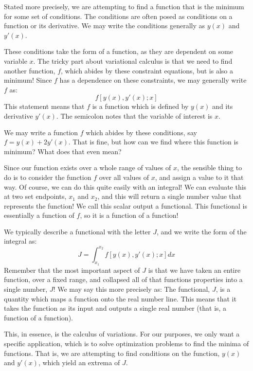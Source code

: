 Stated more precisely, we are attempting to find a function that is the minimum for some set of conditions. The conditions are often posed as conditions on a function or its derivative. We may write the conditions generally as $y(x)$ and $y'(x)$.

These conditions take the form of a function, as they are dependent on some variable $x$. The tricky part about variational calculus is that we need to find another function, $f$, which abides by these constraint equations, but is also a minimum! Since $f$ has a dependence on these constraints, we may generally write $f$ as:
$$f[y(x),y'(x);x]$$
This statement means that $f$ is a function which is defined by $y(x)$ and its derivative $y'(x)$. The semicolon notes that the variable of interest is $x$.

We may write a function $f$ which abides by these conditions, say $f = y(x)+2y'(x)$. That is fine, but how can we find where this function is minimum? What does that even mean?

Since our function exists over a whole range of values of $x$, the sensible thing to do is to consider the function $f$ over all values of $x$, and assign a value to it that way. Of course, we can do this quite easily with an integral! We can evaluate this at two set endpoints, $x_1$ and $x_2$, and this will return a single number value that represents the function! We call this scalar output a \gls{functional}. This \gls{functional} is essentially a function of $f$, so it is a function of a function!

We typically describe a functional with the letter $J$, and we write the form of the integral as:
\begin{equation}\label{eq:functional}
    J=\int_{x_1}^{x_2}f\left[y(x),y'(x);x\right]{dx}
\end{equation}
Remember that the most important aspect of $J$ is that we have taken an entire function, over a fixed range, and collapsed all of that functions properties into a single number, $J$! We may say this more precisely as: The \gls{functional}, $J$, is a quantity which maps a function onto the real number line. This means that it takes the function as its input and outputs a single real number (that is, a function of a function). 

This, in essence, is the calculus of variations. For our purposes, we only want a specific application, which is to solve optimization problems to find the minima of functions. That is, we are attempting to find conditions on the function, $y(x)$ and $y'(x)$, which yield an extrema of $J$. 


